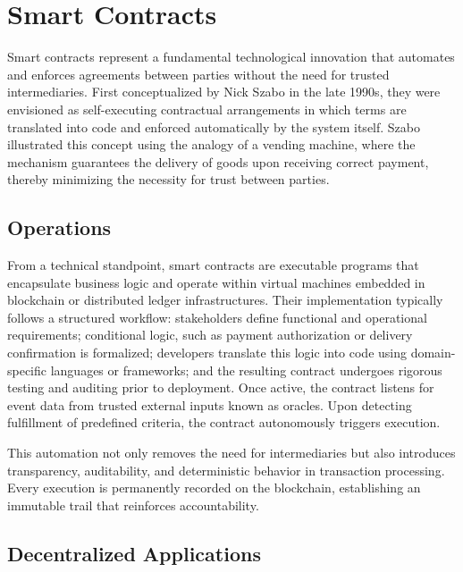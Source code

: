 \documentclass[final]{rc-book-2.14}
\begin{document}
\section{Smart Contracts}
\label{chp:background:sec:smart_cont}

Smart contracts represent a fundamental technological innovation that automates and enforces agreements between parties without the need for trusted intermediaries. First conceptualized by Nick Szabo in the late 1990s, they were envisioned as self-executing contractual arrangements in which terms are translated into code and enforced automatically by the system itself\cite{szabo1996smart}. Szabo illustrated this concept using the analogy of a vending machine, where the mechanism guarantees the delivery of goods upon receiving correct payment, thereby minimizing the necessity for trust between parties\cite{szabo1997formalizing}.

\subsection{Operations}

From a technical standpoint, smart contracts are executable programs that encapsulate business logic and operate within virtual machines embedded in blockchain or distributed ledger infrastructures. Their implementation typically follows a structured workflow: stakeholders define functional and operational requirements; conditional logic, such as payment authorization or delivery confirmation is formalized; developers translate this logic into code using domain-specific languages or frameworks; and the resulting contract undergoes rigorous testing and auditing prior to deployment. Once active, the contract listens for event data from trusted external inputs known as oracles. Upon detecting fulfillment of predefined criteria, the contract autonomously triggers execution\cite{simplilearn2022smart}.

This automation not only removes the need for intermediaries but also introduces transparency, auditability, and deterministic behavior in transaction processing. Every execution is permanently recorded on the blockchain, establishing an immutable trail that reinforces accountability.

\subsection{Decentralized Applications}
\end{document}

